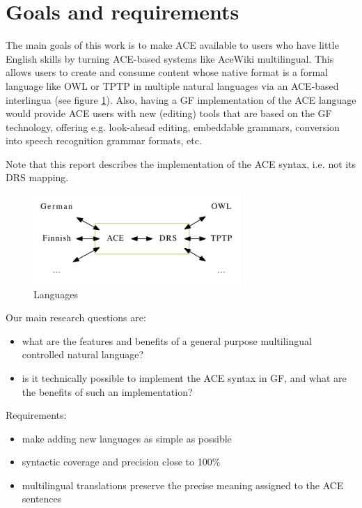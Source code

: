 \documentclass[a4paper]{article}
\begin{document}
\section{Goals and requirements}

The main goals of this work is to make ACE available to users who have little
English skills by turning ACE-based systems like
AceWiki \cite{kuhn2010doctoralthesis} multilingual. This allows users
to create and consume content whose native format is a formal language like
OWL or TPTP in multiple natural languages
via an ACE-based interlingua (see figure \ref{fig:languages}).
Also, having a GF implementation of the ACE language would
provide ACE users with new (editing) tools that are based on the GF technology,
offering e.g. look-ahead editing, embeddable grammars, conversion into
speech recognition grammar formats, etc.

Note that this report describes the implementation of the ACE syntax,
i.e. not its DRS mapping.

\begin{figure}[ht]
\centering
\includegraphics[width=0.7\textwidth]{languages}
\caption[Languages]
{Languages}
\label{fig:languages}
\end{figure}

Our main research questions are:

\begin{itemize}
\item what are the features and benefits of a general purpose multilingual
controlled natural language?
\item is it technically possible to implement the ACE syntax in GF,
and what are the benefits of such an implementation?
\end{itemize}

Requirements:

\begin{itemize}
\item make adding new languages as simple as possible
\item syntactic coverage and precision close to 100\%
\item multilingual translations preserve the precise
meaning assigned to the ACE sentences
\end{itemize}
\end{document}
